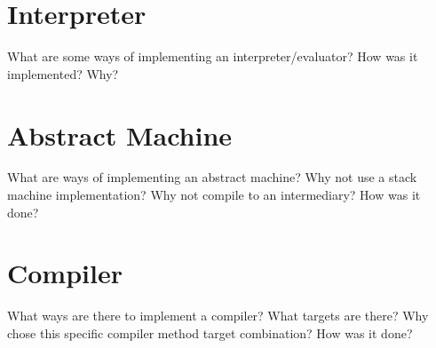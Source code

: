 \section{Interpreter}
What are some ways of implementing an interpreter/evaluator?
How was it implemented?
Why?

\section{Abstract Machine}
What are ways of implementing an abstract machine?
Why not use a stack machine implementation?
Why not compile to an intermediary?
How was it done?

\section{Compiler}
What ways are there to implement a compiler?
What targets are there?
Why chose this specific compiler method target combination?
How was it done?
